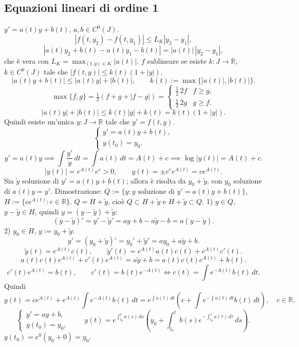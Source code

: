 \documentclass[11pt,a4paper]{article}
\newcommand{\R}{\mathbb R}\newcommand{\N}{\mathbb N}\newcommand{\pagina}[1]{\clearpage}
\begin{document}
\subsection*{Equazioni lineari di ordine 1}
$y'=a(t)y+b(t)$, $a,b\in C^0(J)$.
\[|f(t,y_2)-f(t,y_1)|\le L_K|y_2-y_1|,\]
\[|a(t)y_2+b(t)-a(t)y_1-b(t)|=|a(t)|\,|y_2-y_1|,\]
che è vera con $L_K=\max_{(t,y)\in K}|a(t)|$.
$f$ sublineare se esiste $k:J\to\R$, $k\in C^0(J)$ tale che $|f(t,y)|\le k(t)(1+|y|)$.
\[|a(t)y+b(t)|\le|a(t)y|+|b(t)|,\qquad k(t):=\max\{|a(t)|,|b(t)|\}.\]
\[\max\{f,g\}=\tfrac12(f+g+|f-g|)=\begin{cases}\tfrac12\,2f&f\ge g,\\\tfrac12\,2g&g\ge f.\end{cases}\]
\[|a(t)y|+|b(t)|\le k(t)|y|+k(t)=k(t)(1+|y|).\]
Quindi esiste un'unica $y:J\to\R$ tale che $y'=f(t,y)$.
\pagina{49}
\[\begin{cases}y'=a(t)y+b(t),\\y(t_0)=y_0.\end{cases}\]
\[y'=a(t)y\implies\int\frac{y'}y\,dt=\int a(t)\,dt=A(t)+c\implies\log|y(t)|=A(t)+c.\]
\[|y(t)|=e^{A(t)}e^c>0,\qquad y(t)=\pm e^ce^{A(t)}=ce^{A(t)}.\]
Sia $\widetilde y$ soluzione di $y'=a(t)y+b(t)$; allora è risolta da $y_0+\widetilde y$, con $y_0$ soluzione di $a(t)y=y'$.
Dimostrazione: $Q:=\{y:y\text{ soluzione di }y'=a(t)y+b(t)\}$, $H:=\{ce^{A(t)}:c\in\R\}$. $Q=H+\widetilde y$, cioè $Q\subset H+\widetilde y$ e $H+\widetilde y\subset Q$.
1) $y\in Q$, $y-\widetilde y\in H$, quindi $y=(y-\widetilde y)+\widetilde y$:
\[(y-\widetilde y)'=y'-\widetilde y'=ay+b-a\widetilde y-b=a(y-\widetilde y).\]
2) $y_0\in H$, $y:=y_0+\widetilde y$:
\[y'=(y_0+\widetilde y)'=y_0'+\widetilde y'=ay_0+a\widetilde y+b.\]
\[\widetilde y(t)=e^{A(t)}c(t),\qquad\widetilde y'(t)=e^{A(t)}a(t)c(t)+e^{A(t)}c'(t).\]
\[a(t)c(t)e^{A(t)}+c'(t)e^{A(t)}=a\widetilde y+b=a(t)c(t)e^{A(t)}+b(t).\]
\[c'(t)e^{A(t)}=b(t),\qquad c'(t)=b(t)e^{-A(t)}\iff c(t)=\int e^{-A(t)}b(t)\,dt.\]
Quindi
\[y(t)=ce^{A(t)}+e^{A(t)}\int e^{-A(t)}b(t)\,dt
=e^{\int a(t)\,dt}\left(c+\int e^{-\int a(t)\,dt}b(t)\,dt\right),\quad c\in\R.\]
\pagina{50}
\[\begin{cases}y'=ay+b,\\y(t_0)=y_0,\end{cases}\qquad
 y(t)=e^{\int_{t_0}^t a(s)\,ds}\left(y_0+\int_{t_0}^t b(s)e^{-\int_{t_0}^s a(\tau)\,d\tau}\,ds\right).\]
$y(t_0)=e^0(y_0+0)=y_0$.
\end{document}

